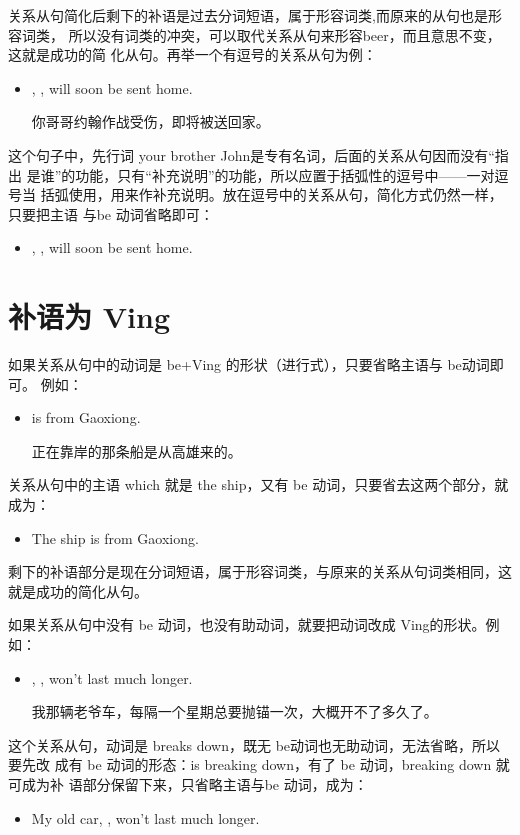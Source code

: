 关系从句简化后剩下的补语是过去分词短语，属于形容词类,而原来的从句也是形容词类，
所以没有词类的冲突，可以取代关系从句来形容beer，而且意思不变，这就是成功的简
化从句。再举一个有逗号的关系从句为例：
\begin{itemize}
\item {}, , will soon be sent home.

你哥哥约翰作战受伤，即将被送回家。
\end{itemize}
这个句子中，先行词 your brother John是专有名词，后面的关系从句因而没有“指出
是谁”的功能，只有“补充说明”的功能，所以应置于括弧性的逗号中——一对逗号当
括弧使用，用来作补充说明。放在逗号中的关系从句，简化方式仍然一样，只要把主语
与be 动词省略即可：
\begin{itemize}
\item {}, , will soon be sent home.
\end{itemize}

\section{补语为 Ving}

如果关系从句中的动词是 be+Ving 的形状（进行式），只要省略主语与 be动词即可。
例如：
\begin{itemize}
\item {}  is from Gaoxiong.

  正在靠岸的那条船是从高雄来的。
\end{itemize}
关系从句中的主语 which 就是 the ship，又有 be
动词，只要省去这两个部分，就成为：
\begin{itemize}
\item The ship  is from Gaoxiong.
\end{itemize}
剩下的补语部分是现在分词短语，属于形容词类，与原来的关系从句词类相同，这就是成功的简化从句。

如果关系从句中没有 be 动词，也没有助动词，就要把动词改成 Ving的形状。例如：
\begin{itemize}
\item {}, , won't last much longer.

  我那辆老爷车，每隔一个星期总要抛锚一次，大概开不了多久了。
\end{itemize}
这个关系从句，动词是 breaks down，既无 be动词也无助动词，无法省略，所以要先改
成有 be 动词的形态：is breaking down，有了 be 动词，breaking down 就可成为补
语部分保留下来，只省略主语与be 动词，成为：
\begin{itemize}
\item My old car, , won't last much longer.
\end{itemize}


